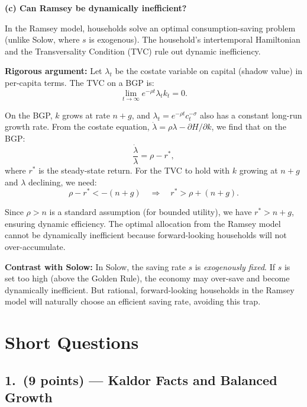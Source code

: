 \documentclass[a4paper,11pt]{article}
\begin{document}
\begin{answerbox}
\textbf{(c) Can Ramsey be dynamically inefficient?}

In the Ramsey model, households solve an optimal consumption-saving problem (unlike Solow, where $s$ is exogenous). The household's intertemporal Hamiltonian and the Transversality Condition (TVC) rule out dynamic inefficiency.

\textbf{Rigorous argument:} Let $\lambda_t$ be the costate variable on capital (shadow value) in per-capita terms. The TVC on a BGP is:
\[
    \lim_{t\to\infty} e^{-\rho t}\lambda_t k_t = 0.
\]

On the BGP, $k$ grows at rate $n+g$, and $\lambda_t = e^{-\rho t}c_t^{-\sigma}$ also has a constant long-run growth rate.  From the costate equation, $\dot{\lambda} = \rho\lambda - \partial H/\partial k$, we find that on the BGP:
\[
    \frac{\dot{\lambda}}{\lambda} = \rho - r^*,
\]
where $r^*$ is the steady-state return. For the TVC to hold with $k$ growing at $n+g$ and $\lambda$ declining, we need:
\[
    \rho - r^* < -(n+g)
    \quad\Longrightarrow\quad
    \boxed{r^* > \rho + (n+g).}
\]

Since $\rho > n$ is a standard assumption (for bounded utility), we have $r^* > n+g$, ensuring dynamic efficiency. The optimal allocation from the Ramsey model cannot be dynamically inefficient because forward-looking households will not over-accumulate.

\textbf{Contrast with Solow:} In Solow, the saving rate $s$ is \emph{exogenously fixed}. If $s$ is set too high (above the Golden Rule), the economy may over-save and become dynamically inefficient. But rational, forward-looking households in the Ramsey model will naturally choose an efficient saving rate, avoiding this trap.
\end{answerbox}

\clearpage

\section{Short Questions}

\subsection*{1.\ (9 points) --- Kaldor Facts and Balanced Growth}
\end{document}
